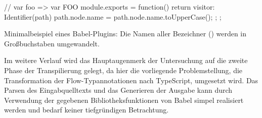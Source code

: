 \bigbreak
\begin{listing}[htb]
\begin{textcode}
// var foo => var FOO
module.exports = function() {
  return {
    visitor: {
      Identifier(path) {
        path.node.name = path.node.name.toUpperCase();
      }
    }
  };
};
\end{textcode}
\listingvspace
\caption[Minimalbeispiel eines Babel-Plugins]{Minimalbeispiel eines Babel-Plugins: Die Namen aller Bezeichner () werden in Großbuchstaben umgewandelt.}
  \label{code:babel-plugin-definition}
\end{listing}

Im weitere Verlauf wird das Hauptaugenmerk der Untersuchung auf die zweite Phase der Transpilierung gelegt, da hier die vorliegende Problemstellung, die Transformation der Flow-Typannotationen nach TypeScript, umgesetzt wird. Das Parsen des Eingabquelltexts und das Generieren der Ausgabe kann durch Verwendung der gegebenen Bibliotheksfunktionen von Babel simpel realisiert werden und bedarf keiner tiefgründigen Betrachtung.

